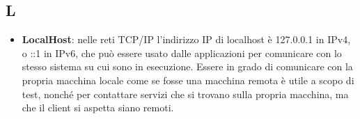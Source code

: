 \subsection{L}
\begin{itemize}
	\item \textbf{LocalHost}: nelle reti TCP/IP l'indirizzo IP di localhost è 127.0.0.1 in IPv4, o ::1 in IPv6, che può essere usato dalle applicazioni per comunicare con lo stesso sistema su cui sono in esecuzione. Essere in grado di comunicare con la propria macchina locale come se fosse una macchina remota è utile a scopo di test, nonché per contattare servizi che si trovano sulla propria macchina, ma che il client si aspetta siano remoti.
\end{itemize}